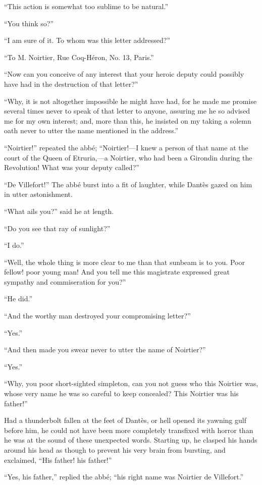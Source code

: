 “This action is somewhat too sublime to be natural.”

“You think so?”

“I am sure of it. To whom was this letter addressed?”

“To M. Noirtier, Rue Coq-Héron, No. 13, Paris.”

“Now can you conceive of any interest that your heroic deputy could
possibly have had in the destruction of that letter?”

“Why, it is not altogether impossible he might have had, for he made me
promise several times never to speak of that letter to anyone, assuring
me he so advised me for my own interest; and, more than this, he
insisted on my taking a solemn oath never to utter the name mentioned
in the address.”

“Noirtier!” repeated the abbé; “Noirtier!—I knew a person of that name
at the court of the Queen of Etruria,—a Noirtier, who had been a
Girondin during the Revolution! What was your deputy called?”

“De Villefort!” The abbé burst into a fit of laughter, while Dantès
gazed on him in utter astonishment.

“What ails you?” said he at length.

“Do you see that ray of sunlight?”

“I do.”

“Well, the whole thing is more clear to me than that sunbeam is to you.
Poor fellow! poor young man! And you tell me this magistrate expressed
great sympathy and commiseration for you?”

“He did.”

“And the worthy man destroyed your compromising letter?”

“Yes.”

“And then made you swear never to utter the name of Noirtier?”

“Yes.”

“Why, you poor short-sighted simpleton, can you not guess who this
Noirtier was, whose very name he was so careful to keep concealed? This
Noirtier was his father!”

Had a thunderbolt fallen at the feet of Dantès, or hell opened its
yawning gulf before him, he could not have been more completely
transfixed with horror than he was at the sound of these unexpected
words. Starting up, he clasped his hands around his head as though to
prevent his very brain from bursting, and exclaimed, “His father! his
father!”

“Yes, his father,” replied the abbé; “his right name was Noirtier de
Villefort.”

